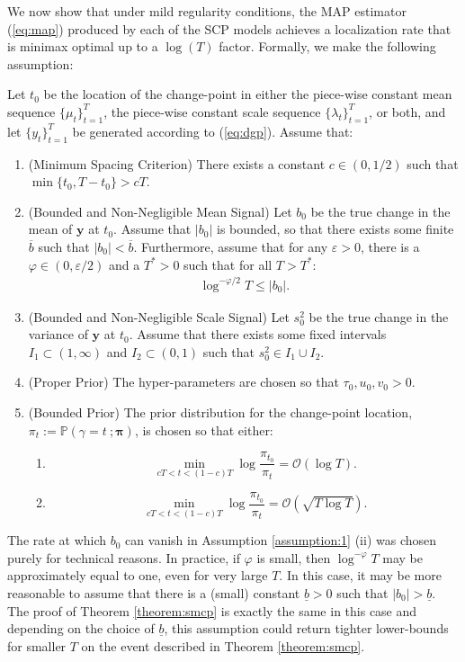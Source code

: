 We now show that under mild regularity conditions, the MAP estimator (\ref{eq:map}) produced by each of the SCP models achieves a localization rate that is minimax optimal up to a $\log(T)$ factor. Formally, we make the following assumption:
\begin{assumption}\label{assumption:1}
    Let $t_0$ be the location of the change-point in either the piece-wise constant mean sequence $\{\mu_t\}_{t=1}^T$, the piece-wise constant scale sequence $\{\lambda_t\}_{t=1}^T$, or both, and let $\{y_t\}_{t=1}^T$ be generated according to (\ref{eq:dgp}). Assume that:
    \begin{enumerate}[label=(\roman*)]
        \item (Minimum Spacing Criterion) There exists a constant $c \in (0,1/2)$ such that $\min\{t_0,T-t_0\} > cT$. 
        \item (Bounded and Non-Negligible Mean Signal) Let $b_0$ be the true change in the mean of $\mathbf{y}$ at $t_0$. Assume that $|b_0|$ is bounded, so that there exists some finite $\overline{b}$ such that $|b_0| < \overline{b}$. Furthermore, assume that for any $\varepsilon > 0$, there is a $\varphi \in (0,\varepsilon/2)$ and a $T^* > 0$ such that for all  $T > T^*$: 
        \begin{align*}
            \log^{-\varphi/2}T \leq |b_0|.
        \end{align*}
        \item (Bounded and Non-Negligible Scale Signal) Let $s^2_0$ be the true change in the variance of $\mathbf{y}$ at $t_0$. Assume that there exists some fixed intervals $I_1 \subset (1, \infty)$ and $I_2 \subset (0, 1)$ such that $s_0^2 \in I_1 \cup I_2$. 
        \item (Proper Prior) The hyper-parameters are chosen so that $\tau_0, u_0, v_0 > 0$.
        \item (Bounded Prior) The prior distribution for the change-point location, $\pi_t := \mathbb{P}(\gamma = t \:; \pmb{\pi})$, is chosen so that either:
        \begin{enumerate}
            \item $$\min_{cT < t < (1-c) T} \log \frac{\pi_{t_0}}{\pi_{t}} = \mathcal{O}(\log T).$$
            \item $$\min_{cT < t < (1-c) T} \log \frac{\pi_{t_0}}{\pi_{t}} = \mathcal{O}(\sqrt{T\log T}).$$
        \end{enumerate}
    \end{enumerate}
\end{assumption}
\begin{remark} \label{rmk:1}
    The rate at which $b_0$ can vanish in Assumption \ref{assumption:1} (ii) was chosen purely for technical reasons. In practice, if $\varphi$ is small, then $\log^{-\varphi}T$ may be approximately equal to one, even for very large $T$. In this case, it may be more reasonable to assume that there is a (small) constant $\underline{b} > 0$ such that $|b_0| > \underline{b}$. The proof of Theorem \ref{theorem:smcp} is exactly the same in this case and depending on the choice of $\underline{b}$, this assumption could return tighter lower-bounds for smaller $T$ on the event described in Theorem \ref{theorem:smcp}.
\end{remark}
